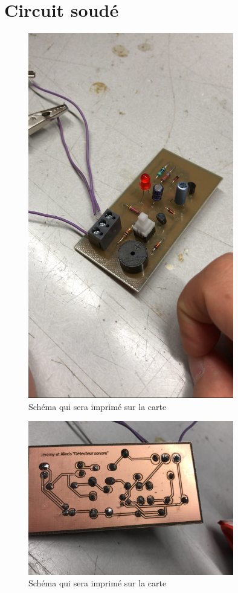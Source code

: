 \section{Circuit soudé}

\begin{figure}[H]
\centering
\includegraphics[width=0.8\textwidth]{ressources/carteSouder}
\caption{Schéma qui sera imprimé sur la carte}
\label{schemaBoard}
\end{figure}


\begin{figure}[H]
\centering
\includegraphics[width=0.8\textwidth]{ressources/soudure}
\caption{Schéma qui sera imprimé sur la carte}
\label{schemaBoard}
\end{figure}



